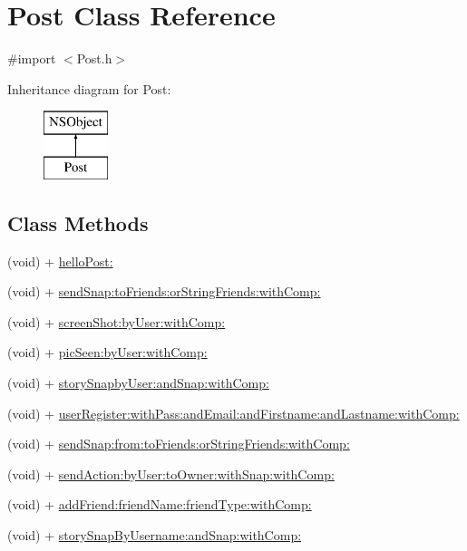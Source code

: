 \hypertarget{interface_post}{}\section{Post Class Reference}
\label{interface_post}


{\ttfamily \#import $<$Post.\+h$>$}

Inheritance diagram for Post\+:\begin{figure}[H]
\begin{center}
\leavevmode
\includegraphics[height=2.000000cm]{interface_post}
\end{center}
\end{figure}
\subsection*{Class Methods}
\begin{DoxyCompactItemize}
\item 
(void) + \hyperlink{interface_post_a8cb1a6ca0e1f76e9d2f98c46713c496e}{hello\+Post\+:}
\item 
(void) + \hyperlink{interface_post_a0b8e17e3d30c10fd7bd134e6b3ef6a1a}{send\+Snap\+:to\+Friends\+:or\+String\+Friends\+:with\+Comp\+:}
\item 
(void) + \hyperlink{interface_post_abacb3cb0c44c2b28e1db7ab94ddf8666}{screen\+Shot\+:by\+User\+:with\+Comp\+:}
\item 
(void) + \hyperlink{interface_post_aed7e0dfdd2fa3c38108c08d067565740}{pic\+Seen\+:by\+User\+:with\+Comp\+:}
\item 
(void) + \hyperlink{interface_post_a4465916d9360570eecc45ec5e4f3b405}{story\+Snapby\+User\+:and\+Snap\+:with\+Comp\+:}
\item 
(void) + \hyperlink{interface_post_a1c6363f5ccef293edf135ca5d2a8af14}{user\+Register\+:with\+Pass\+:and\+Email\+:and\+Firstname\+:and\+Lastname\+:with\+Comp\+:}
\item 
(void) + \hyperlink{interface_post_a057b7fe5bde8898cfd5384d103fa223e}{send\+Snap\+:from\+:to\+Friends\+:or\+String\+Friends\+:with\+Comp\+:}
\item 
(void) + \hyperlink{interface_post_a24f3ff95284694a61b70a46e3c257ac7}{send\+Action\+:by\+User\+:to\+Owner\+:with\+Snap\+:with\+Comp\+:}
\item 
(void) + \hyperlink{interface_post_a245c914523d8fd603171547c0c82d3c5}{add\+Friend\+:friend\+Name\+:friend\+Type\+:with\+Comp\+:}
\item 
(void) + \hyperlink{interface_post_afc7290f582fbcd44144662be256b8dc7}{story\+Snap\+By\+Username\+:and\+Snap\+:with\+Comp\+:}
\end{DoxyCompactItemize}



